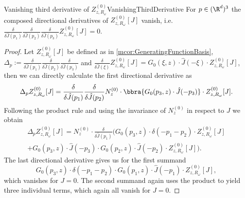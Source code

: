\begin{mlem}{Vanishing third derivative of $Z_{z,R_\omega}^{(0)}$}{VanishingThirdDerivative}
    For $p\in(\R^d)^3$ the composed directional derivatives of $Z_{z,R_\omega}^{(0)}[J]$ vanish, i.e. $\frac{\delta}{\delta \hat J(p_1)}\frac{\delta}{\delta \hat J(p_2)}\frac{\delta}{\delta \hat J(p_3)}Z_{z,R_\omega}^{(0)}[J] = 0$.
\end{mlem}
\begin{proof}
    Let $Z_{z,R_\omega}^{(0)}[J]$ be defined as in \ref{mcor:GeneratingFunctionBasis}, $\Delta_p:=\frac{\delta}{\delta \hat J(p_1)}\frac{\delta}{\delta \hat J(p_2)}\frac{\delta}{\delta \hat J(p_3)}$ and $\frac{\delta}{\delta \hat J(\xi)}Z_{z,R_\omega}^{(0)}[J] = G_0(\xi,z)\cdot \hat J(-\xi)\cdot Z_{z,R_\omega}^{(0)}[J]$, then we can directly calculate the first directional derivative as
    \[
        \Delta_pZ_{z,R_\omega}^{(0)}[J] = \frac{\delta}{\delta \hat J(p_1)}\frac{\delta}{\delta \hat J(p_2)} N_z^{(0)}\cdot \bbra{
            G_0(p_3,z)\cdot \hat J(-p_3)
        }\cdot Z_{z,R_\omega}^{(0)}[J].
    \]
    Following the product rule and using the invariance of $N_z^{(0)}$ in respect to $J$ we obtain
    \begin{multline*}
        \Delta_pZ_{z,R_\omega}^{(0)}[J] = N_z^{(0)}\cdot\frac{\delta}{\delta \hat J(p_1)}\bigl(
            G_0(p_3,z)\cdot \delta(-p_1-p_2)\cdot Z_{z,R_\omega}^{(0)}[J] \\
            + G_0(p_3,z)\cdot \hat J(-p_3)\cdot G_0(p_2,z)\cdot \hat J(-p_2)\cdot Z_{z,R_\omega}^{(0)}[J]
        \bigr).
    \end{multline*}
    The last directional derivative gives us for the first summand
    \[
        G_0(p_3,z)\cdot \delta(-p_1-p_2)\cdot G_0(p_1,z)\cdot \hat J(-p_1)\cdot Z_{z,R_\omega}^{(0)}[J],
    \]
    which vanishes for $J = 0$. The second summand again uses the product to yield three individual terms, which again all vanish for $J = 0$. 
\end{proof}